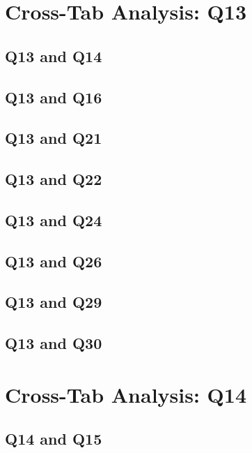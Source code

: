 \documentclass{report}
\begin{document}
\chapter{Cross-Tab Analysis: Q13}
\section{Q13 and Q14}


\clearpage
\section{Q13 and Q16}


\clearpage
\section{Q13 and Q21}


\clearpage
\section{Q13 and Q22}


\clearpage
\section{Q13 and Q24}


\clearpage
\section{Q13 and Q26}


\clearpage
\section{Q13 and Q29}


\clearpage
\section{Q13 and Q30}


\chapter{Cross-Tab Analysis: Q14}
\section{Q14 and Q15}

\end{document}
